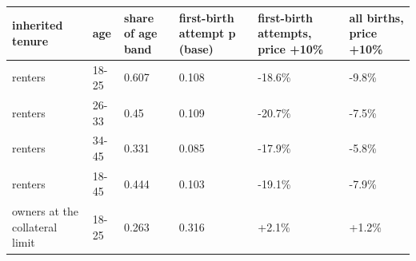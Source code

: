 \begingroup\small
\setlength{\tabcolsep}{3pt}
\renewcommand{\arraystretch}{1.04}
\begin{tabularx}{\linewidth}{XXXXXX}
\toprule
inherited tenure & age & share of age band & first-birth attempt p (base) & first-birth attempts, price +10\% & all births, price +10\% \\
\midrule
renters & 18-25 & 0.607 & 0.108 & -18.6\% & -9.8\% \\
renters & 26-33 & 0.45 & 0.109 & -20.7\% & -7.5\% \\
renters & 34-45 & 0.331 & 0.085 & -17.9\% & -5.8\% \\
renters & 18-45 & 0.444 & 0.103 & -19.1\% & -7.9\% \\
owners at the collateral limit & 18-25 & 0.263 & 0.316 & +2.1\% & +1.2\% \\
\bottomrule
\end{tabularx}
\endgroup
